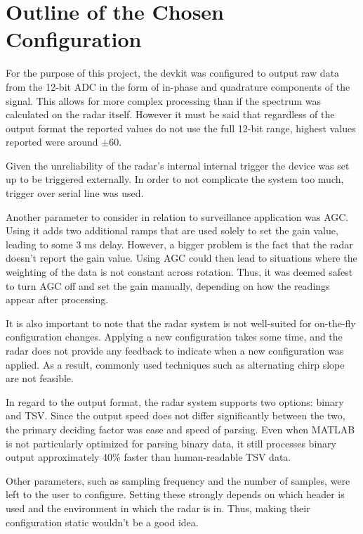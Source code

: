 \section{Outline of the Chosen Configuration }

For the purpose of this project, the devkit was configured to output raw data from the 12-bit ADC in the form of in-phase and quadrature components of the signal.
This allows for more complex processing than if the spectrum was calculated on the radar itself.
However it must be said that regardless of the output format the reported values do not use the full 12-bit range, highest values reported were around $\pm 60$.

Given the unreliability of the radar's internal internal trigger the device was set up to be triggered externally.
In order to not complicate the system too much, trigger over serial line was used.

Another parameter to consider in relation to surveillance application was AGC.
Using it adds two additional ramps that are used solely to set the gain value, leading to some 3 ms delay.
However, a bigger problem is the fact that the radar doesn't report the gain value.
Using AGC could then lead to situations where the weighting of the data is not constant across rotation.
Thus, it was deemed safest to turn AGC off and set the gain manually, depending on how the readings appear after processing.

It is also important to note that the radar system is not well-suited for on-the-fly configuration changes.
Applying a new configuration takes some time, and the radar does not provide any feedback to indicate when a new configuration was applied.
As a result, commonly used techniques such as alternating chirp slope are not feasible.

In regard to the output format, the radar system supports two options: binary and TSV.
Since the output speed does not differ significantly between the two, the primary deciding factor was ease and speed of parsing.
Even when MATLAB is not particularly optimized for parsing binary data, it still processes binary output approximately 40\% faster than human-readable TSV data.

Other parameters, such as sampling frequency and the number of samples, were left to the user to configure.
Setting these strongly depends on which header is used and the environment in which the radar is in.
Thus, making their configuration static wouldn't be a good idea.


